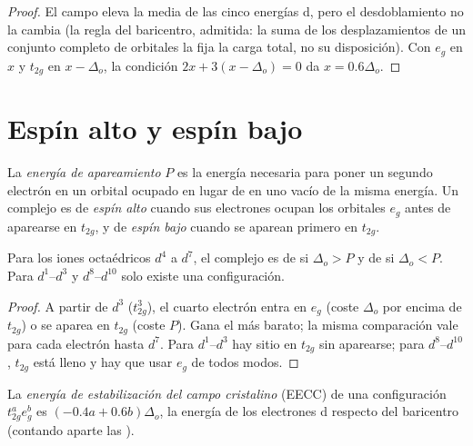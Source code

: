 \begin{proof}
El campo eleva la media de las cinco energías d, pero el desdoblamiento no la cambia
(la regla del baricentro, admitida: la suma de los desplazamientos de un conjunto completo de
orbitales la fija la carga total, no su disposición). Con $e_g$ en $x$ y
$t_{2g}$ en $x - \Delta_o$, la condición $2x + 3(x - \Delta_o) = 0$ da $x = 0.6\Delta_o$.
\end{proof}

\section{Espín alto y espín bajo}

\begin{definition}\label{def:b2:ligand-field:spin}
La \emph{energía de apareamiento} $P$ es la energía necesaria para poner un segundo
electrón en un orbital ocupado en lugar de en uno vacío de la misma energía. Un
complejo es de \emph{espín alto} cuando sus electrones ocupan los orbitales $e_g$
antes de aparearse en $t_{2g}$, y de \emph{espín bajo} cuando se aparean primero en $t_{2g}$.
\end{definition}

\begin{proposition}\label{prop:b2:ligand-field:spin-state}
Para los iones octaédricos $d^4$ a $d^7$, el complejo es de  si $\Delta_o > P$ y de 
si $\Delta_o < P$. Para $d^1$--$d^3$ y $d^8$--$d^{10}$ solo existe una configuración.
\end{proposition}

\begin{proof}
A partir de $d^3$ ($t_{2g}^3$), el cuarto electrón entra en $e_g$ (coste $\Delta_o$ por encima de
$t_{2g}$) o se aparea en $t_{2g}$ (coste $P$). Gana el más barato; la misma comparación vale
para cada electrón hasta $d^7$. Para $d^1$--$d^3$ hay sitio en $t_{2g}$ sin aparearse;
para $d^8$--$d^{10}$, $t_{2g}$ está lleno y hay que usar $e_g$ de todos modos.
\end{proof}

\begin{definition}\label{def:b2:ligand-field:cfse}
La \emph{energía de estabilización del campo cristalino}
(EECC) de una configuración $t_{2g}^ae_g^b$ es $(-0.4a + 0.6b)\Delta_o$, la energía de
los electrones d respecto del baricentro (contando aparte las ).
\end{definition}

